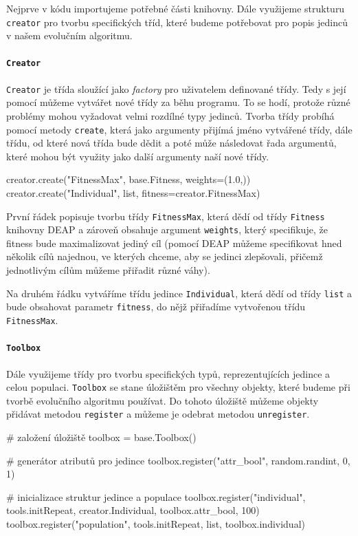 Nejprve v kódu importujeme potřebné části knihovny. Dále využijeme strukturu
\texttt{creator} pro tvorbu specifických tříd, které budeme potřebovat pro
popis jedinců v našem evolučním algoritmu.

\paragraph{\texttt{Creator}} 
\texttt{Creator} je třída sloužící jako \emph{factory} pro uživatelem
definované třídy. Tedy s její pomocí můžeme vytvářet nové třídy za běhu
programu. To se hodí, protože různé problémy mohou vyžadovat velmi rozdílné
typy jedinců. Tvorba třídy probíhá pomocí metody \texttt{create}, která jako
argumenty přijímá jméno vytvářené třídy, dále třídu, od které nová třída bude
dědit a poté může následovat řada argumentů, které mohou být využity jako další
argumenty naší nové třídy.

\begin{code}
creator.create("FitnessMax", base.Fitness, weights=(1.0,))
creator.create("Individual", list, fitness=creator.FitnessMax)
\end{code}

První řádek popisuje tvorbu třídy \texttt{FitnessMax}, která dědí od třídy
\texttt{Fitness} knihovny DEAP a zároveň obsahuje argument \texttt{weights},
který specifikuje, že fitness bude maximalizovat jediný cíl (pomocí DEAP můžeme
specifikovat hned několik cílů najednou, ve kterých chceme, aby se jedinci
zlepšovali, přičemž jednotlivým cílům můžeme přiřadit různé váhy).

Na druhém řádku vytváříme třídu jedince \texttt{Individual}, která dědí od
třídy \texttt{list} a bude obsahovat parametr \texttt{fitness}, do nějž
přiřadíme vytvořenou třídu \texttt{FitnessMax}.

\paragraph{\texttt{Toolbox}}
Dále využijeme třídy pro tvorbu specifických typů, reprezentujících jedince a
celou populaci. \texttt{Toolbox} se stane úložištěm pro všechny objekty, které
budeme při tvorbě evolučního algoritmu používat. Do tohoto úložiště můžeme
objekty přidávat metodou \texttt{register} a můžeme je odebrat metodou
\texttt{unregister}.

\pagebreak
\begin{code}
# založení úložiště 
toolbox = base.Toolbox()

# generátor atributů pro jedince
toolbox.register("attr_bool", random.randint, 0, 1)

# inicializace struktur jedince a populace
toolbox.register("individual", 
                 tools.initRepeat, 
                 creator.Individual, 
                 toolbox.attr_bool, 
                 100)
toolbox.register("population", 
                 tools.initRepeat, 
                 list, 
                 toolbox.individual)
\end{code}

